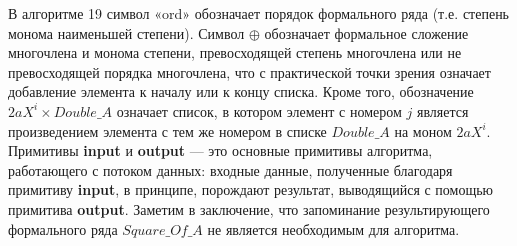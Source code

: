 В алгоритме 19 символ «ord» обозначает порядок формального ряда
(т.е. степень монома наименьшей степени). Символ $\oplus$ обозначает формальное
сложение многочлена и монома степени, превосходящей степень многочлена
или не превосходящей порядка многочлена, что с практической точки зрения
означает добавление элемента к началу или к концу списка. Кроме того,
обозначение $2aX^i \times Double\_A$ означает список, в котором элемент с номером $j$
является произведением элемента с тем же номером в списке $Double\_A$ на моном $2aX^i$.
Примитивы \textbf{input} и \textbf{output} — это основные примитивы алгоритма, работающего с потоком
данных: входные данные, полученные благодаря примитиву \textbf{input}, в принципе, порождают
результат, выводящийся с помощью примитива \textbf{output}. Заметим в заключение, что запоминание
результирующего формального ряда $Square\_Of\_A$ не является необходимым для алгоритма.

